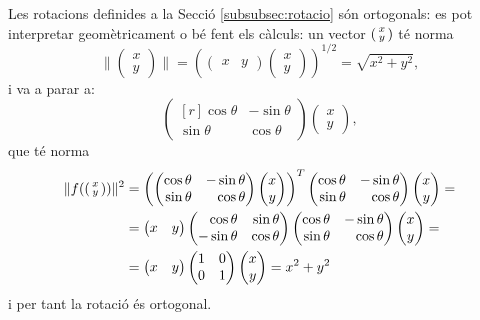 \begin{exemple}
Les rotacions definides a la Secció \ref{subsubsec:rotacio} són ortogonals: es pot interpretar geomètricament o bé fent els càlculs: un vector $\left(\begin{smallmatrix}x\\y\end{smallmatrix}\right)$ té norma
\[
\|\begin{pmatrix}x \\ y \end{pmatrix}\|=\left(\begin{pmatrix} x & y \end{pmatrix}\begin{pmatrix} x \\ y \end{pmatrix}\right)^{1/2} = \sqrt{x^2+y^2},
\]
i va a parar a:
\[
\begin{pmatrix*}[r]
\cos\theta&-\sin\theta\\
\sin\theta&\cos\theta
\end{pmatrix*}
\begin{pmatrix}x \\ y \end{pmatrix} ,
\]
que té norma
\begin{align*}
\|f(\smat{x\\y})\|^2 & =\left( \begin{pmatrix*}[r]
\cos\theta&-\sin\theta\\
\sin\theta&\cos\theta
\end{pmatrix*}
\begin{pmatrix}x \\ y \end{pmatrix}  \right)^T
\begin{pmatrix*}[r]
\cos\theta&-\sin\theta\\
\sin\theta&\cos\theta
\end{pmatrix*}
\begin{pmatrix}x \\ y \end{pmatrix} = \\
& = \begin{pmatrix}x &  y \end{pmatrix}
\begin{pmatrix*}[r]
\cos\theta&\sin\theta\\
-\sin\theta&\cos\theta
\end{pmatrix*}
\begin{pmatrix*}[r]
\cos\theta&-\sin\theta\\
\sin\theta&\cos\theta
\end{pmatrix*}
\begin{pmatrix}x \\ y \end{pmatrix} = \\
& = \begin{pmatrix}x &  y \end{pmatrix}
\begin{pmatrix*}[r]
1&0\\
0&1
\end{pmatrix*}
\begin{pmatrix}x \\ y \end{pmatrix} = x^2+y^2\\
\end{align*} 
i per tant la rotació és ortogonal.
\end{exemple}
